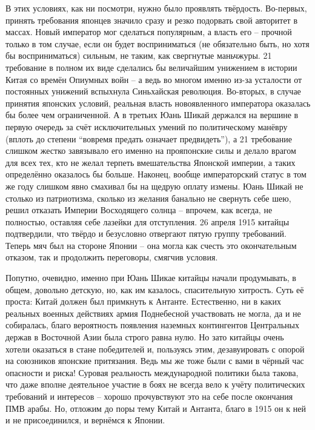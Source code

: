 В этих условиях, как ни посмотри, нужно было проявлять твёрдость. Во-первых, принять требования японцев значило сразу и резко подорвать свой авторитет в массах. Новый император мог сделаться популярным, а власть его – прочной только в том случае, если он будет восприниматься (не обязательно быть, но хотя бы восприниматься) сильным, не таким, как свергнутые маньчжуры. 21 требование в полном их виде сделались бы величайшим унижением в истории Китая со времён Опиумных войн – а ведь во многом именно из-за усталости от постоянных унижений вспыхнула Синьхайская революция. Во-вторых, в случае принятия японских условий, реальная власть новоявленного императора оказалась бы более чем ограниченной. А в третьих Юань Шикай держался на вершине в первую очередь за счёт исключительных умений по политическому манёвру (вплоть до степени “вовремя предать означает предвидеть”), а 21 требование слишком жестко завязывало его именно на прояпонские силы и делало врагом для всех тех, кто не желал терпеть вмешательства Японской империи, а таких определённо оказалось бы больше. Наконец, вообще императорский статус в том же году слишком явно смахивал бы на щедрую оплату измены. Юань Шикай не столько из патриотизма, сколько из желания банально не свернуть себе шею, решил отказать Империи Восходящего солнца – впрочем, как всегда, не полностью, оставляя себе лазейки для отступления. 26 апреля 1915 китайцы подтвердили, что твёрдо и безусловно отвергают пятую группу требований. Теперь мяч был на стороне Японии – она могла как счесть это окончательным отказом, так и продолжить переговоры, смягчив условия.

Попутно, очевидно, именно при Юань Шикае китайцы начали продумывать, в общем, довольно детскую, но, как им казалось, спасительную хитрость. Суть её проста: Китай должен был примкнуть к Антанте. Естественно, ни в каких реальных военных действиях армия Поднебесной участвовать не могла, да и не собиралась, благо вероятность появления наземных контингентов Центральных держав в Восточной Азии была строго равна нулю. Но зато китайцы очень хотели оказаться в стане победителей и, пользуясь этим, дезавуировать с опорой на союзников японские притязания. Ведь мы же тоже были с вами в чёрный час опасности и риска! Суровая реальность международной политики была такова, что даже вполне деятельное участие в боях не всегда вело к учёту политических требований и интересов – хорошо прочувствуют это на себе после окончания ПМВ арабы. Но, отложим до поры тему Китай и Антанта, благо в 1915 он к ней и не присоединился, и вернёмся к Японии.

